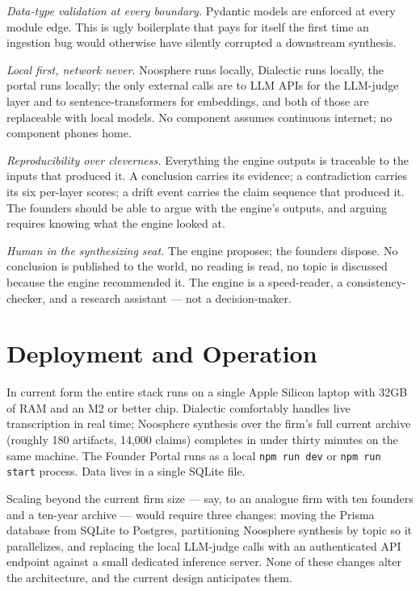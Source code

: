 \documentclass[11pt]{article}
\begin{document}
\textit{Data-type validation at every boundary.} Pydantic models are enforced at every module edge. This is ugly boilerplate that pays for itself the first time an ingestion bug would otherwise have silently corrupted a downstream synthesis.

\textit{Local first, network never.} Noosphere runs locally, Dialectic runs locally, the portal runs locally; the only external calls are to LLM APIs for the LLM-judge layer and to sentence-transformers for embeddings, and both of those are replaceable with local models. No component assumes continuous internet; no component phones home.

\textit{Reproducibility over cleverness.} Everything the engine outputs is traceable to the inputs that produced it. A conclusion carries its evidence; a contradiction carries its six per-layer scores; a drift event carries the claim sequence that produced it. The founders should be able to argue with the engine's outputs, and arguing requires knowing what the engine looked at.

\textit{Human in the synthesizing seat.} The engine proposes; the founders dispose. No conclusion is published to the world, no reading is read, no topic is discussed because the engine recommended it. The engine is a speed-reader, a consistency-checker, and a research assistant --- not a decision-maker.

\clearpage

\section{Deployment and Operation}

In current form the entire stack runs on a single Apple Silicon laptop with 32GB of RAM and an M2 or better chip. Dialectic comfortably handles live transcription in real time; Noosphere synthesis over the firm's full current archive (roughly 180 artifacts, 14{,}000 claims) completes in under thirty minutes on the same machine. The Founder Portal runs as a local \texttt{npm run dev} or \texttt{npm run start} process. Data lives in a single SQLite file.

Scaling beyond the current firm size --- say, to an analogue firm with ten founders and a ten-year archive --- would require three changes: moving the Prisma database from SQLite to Postgres, partitioning Noosphere synthesis by topic so it parallelizes, and replacing the local LLM-judge calls with an authenticated API endpoint against a small dedicated inference server. None of these changes alter the architecture, and the current design anticipates them.
\end{document}
